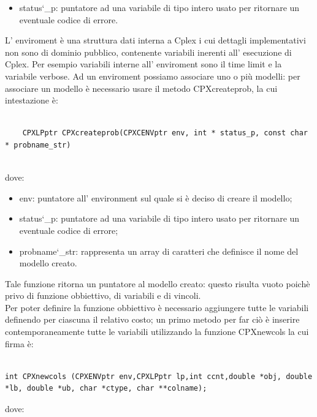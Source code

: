 \documentclass[11pt]{article}
\begin{document}
\begin{itemize}
\item status\char`_p: puntatore ad una variabile di tipo intero usato per ritornare un eventuale codice di errore.
\end{itemize}


L' enviroment \`e una struttura dati interna a Cplex i cui dettagli implementativi non sono di dominio pubblico, contenente variabili inerenti all' esecuzione di Cplex. Per esempio variabili interne all' enviroment sono il time limit e la variabile verbose. Ad un enviroment possiamo associare uno o pi\`u modelli: per associare un modello \`e necessario usare il metodo CPXcreateprob, la cui intestazione \`e:

\begin{lstlisting}

    CPXLPptr CPXcreateprob(CPXCENVptr env, int * status_p, const char * probname_str)


\end{lstlisting}


dove:

\begin{itemize}
	\item env: puntatore all' environment sul quale si \`e deciso di creare il modello;
	\item status\char`_p: puntatore ad una variabile di tipo intero usato per ritornare un eventuale codice di errore;
	\item probname\char`_str: rappresenta un array di caratteri che definisce il nome del modello creato.
\end{itemize}

Tale funzione ritorna un puntatore al modello creato: questo risulta vuoto poich\`e  privo di funzione obbiettivo, di variabili e di vincoli.\\

Per poter definire la funzione obbiettivo \`e necessario aggiungere tutte le variabili definendo per ciascuna il relativo costo; un primo metodo per far ci\`o \`e inserire contemporaneamente tutte le variabili utilizzando la funzione CPXnewcols la cui firma \`e:


\begin{lstlisting}

int CPXnewcols (CPXENVptr env,CPXLPptr lp,int ccnt,double *obj, double *lb, double *ub, char *ctype, char **colname);

\end{lstlisting}

dove:
\end{document}
